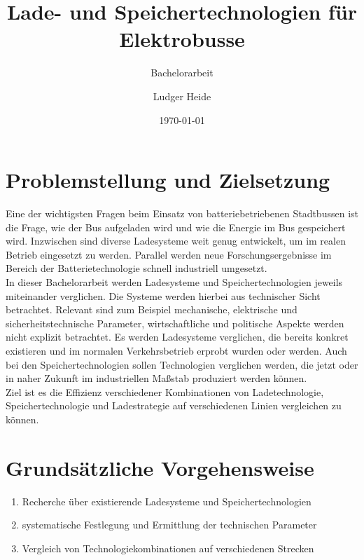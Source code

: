 \documentclass{scrartcl}
\title{Lade- und Speichertechnologien für Elektrobusse}
\subtitle{Bachelorarbeit}
\date{\today}
\author{Ludger Heide}
\begin{document}

\maketitle


\section*{Problemstellung und Zielsetzung}
Eine der wichtigsten Fragen beim Einsatz von batteriebetriebenen Stadtbussen ist die Frage, wie der Bus aufgeladen wird und wie die Energie im Bus gespeichert wird. Inzwischen sind diverse Ladesysteme weit genug entwickelt, um im realen Betrieb eingesetzt zu werden. Parallel werden neue Forschungsergebnisse im Bereich der Batterietechnologie schnell industriell umgesetzt.\\
In dieser Bachelorarbeit werden Ladesysteme und Speichertechnologien jeweils miteinander verglichen. Die Systeme werden hierbei aus technischer Sicht betrachtet. Relevant sind zum Beispiel mechanische, elektrische und sicherheitstechnische Parameter, wirtschaftliche und politische Aspekte werden nicht explizit betrachtet. Es werden Ladesysteme verglichen, die bereits konkret existieren und im normalen Verkehrsbetrieb erprobt wurden oder werden. Auch bei den Speichertechnologien sollen Technologien verglichen werden, die jetzt oder in naher Zukunft im industriellen Maßstab produziert werden können.\\
Ziel ist es die Effizienz verschiedener Kombinationen von Ladetechnologie, Speichertechnologie und Ladestrategie auf verschiedenen Linien vergleichen zu können.

\section*{Grundsätzliche Vorgehensweise}
\begin{enumerate}
	\item Recherche über existierende Ladesysteme und Speichertechnologien
	\item systematische Festlegung und Ermittlung der technischen Parameter
	\item Vergleich von Technologiekombinationen auf verschiedenen Strecken
\end{enumerate}


\end{document}
